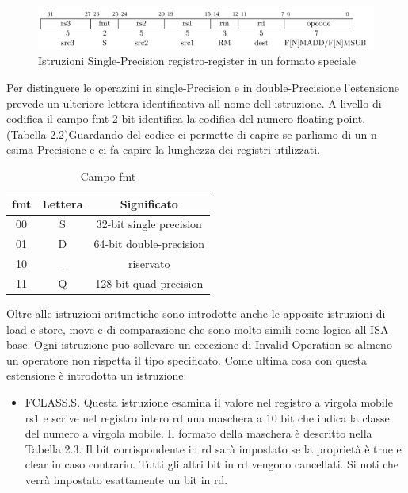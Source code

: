 \documentclass[12pt,a4paper]{report}
\begin{document}
\begin{figure}
	\includegraphics[width = \textwidth]{Istruzioni/IstruzioniF/Istruction2_F.png}
	\caption{Istruzioni Single-Precision registro-register in un formato speciale }
	\label{Fig:Istruzioni_SP-Special}
\end{figure}

Per distinguere le operazini in single-Precision e in double-Precisione l'estensione prevede un ulteriore lettera identificativa all nome dell istruzione. A livello di codifica il campo fmt 2 bit identifica la codifica del numero floating-point.  (Tabella 2.2)Guardando del codice ci permette di capire se parliamo di un n-esima Precisione  e ci fa capire la lunghezza dei registri utilizzati.


\begin{table}
\centering
\begin{tabular}{ |c|c|c| }
\hline
fmt & Lettera & Significato \\
\hline
00 & S & 32-bit single precision \\
\hline
01 & D & 64-bit double-precision\\
\hline
10 & \_ & riservato \\
\hline
11 & Q & 128-bit quad-precision \\
\hline
\end{tabular}
\caption{Campo fmt}
\label{Tab:Tabella_significato_fmt}
\end{table}


Oltre alle istruzioni aritmetiche sono introdotte anche le apposite istruzioni di load e store, move e di comparazione che sono molto simili come logica all ISA base. Ogni istruzione puo sollevare un eccezione di Invalid Operation se almeno un operatore non rispetta il tipo specificato.
Come ultima cosa con questa estensione è introdotta un istruzione:
\begin{itemize}
	\item FCLASS.S. Questa istruzione esamina il valore nel registro a virgola mobile rs1 e scrive nel registro intero rd una maschera a 10 bit che indica la classe del numero a virgola mobile. Il formato della maschera è descritto nella Tabella 2.3. Il bit corrispondente in rd sarà impostato se la proprietà è true e clear in caso contrario. Tutti gli altri bit in rd vengono cancellati. Si noti che verrà impostato esattamente un bit in rd.
\end{itemize}
\end{document}
